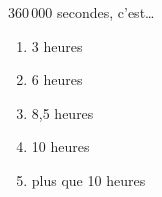360\,000 secondes, c'est\ldots
\begin{multicols}{5}
  \begin{enumerate}[A/]
  \item 3 heures
  \item 6 heures
  \item 8,5 heures
  \item 10 heures
  \item plus que 10 heures
  \end{enumerate}
\end{multicols}
